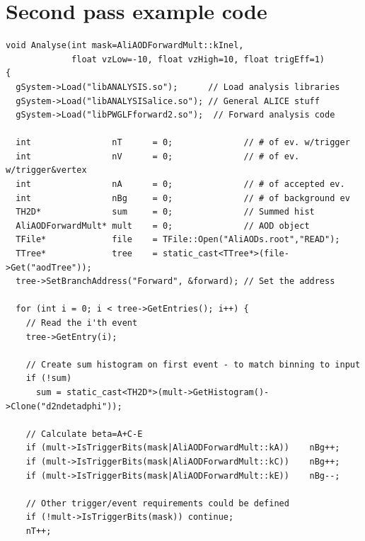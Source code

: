 \documentclass[11pt]{article}
\begin{document}
\section{Second pass example code}
\label{app:exa_pass2}
\begin{lstlisting}[caption={Example 2\textsuperscript{nd} pass code to
    do $\dndeta$},label={lst:example},frame=single,captionpos=b]
void Analyse(int mask=AliAODForwardMult::kInel,
             float vzLow=-10, float vzHigh=10, float trigEff=1)
{ 
  gSystem->Load("libANALYSIS.so");      // Load analysis libraries
  gSystem->Load("libANALYSISalice.so"); // General ALICE stuff
  gSystem->Load("libPWGLFforward2.so");  // Forward analysis code

  int                nT      = 0;              // # of ev. w/trigger
  int                nV      = 0;              // # of ev. w/trigger&vertex
  int                nA      = 0;              // # of accepted ev.
  int                nBg     = 0;              // # of background ev
  TH2D*              sum     = 0;              // Summed hist
  AliAODForwardMult* mult    = 0;              // AOD object
  TFile*             file    = TFile::Open("AliAODs.root","READ");
  TTree*             tree    = static_cast<TTree*>(file->Get("aodTree"));
  tree->SetBranchAddress("Forward", &forward); // Set the address

  for (int i = 0; i < tree->GetEntries(); i++) { 
    // Read the i'th event 
    tree->GetEntry(i);

    // Create sum histogram on first event - to match binning to input
    if (!sum) 
      sum = static_cast<TH2D*>(mult->GetHistogram()->Clone("d2ndetadphi"));
    
    // Calculate beta=A+C-E
    if (mult->IsTriggerBits(mask|AliAODForwardMult::kA))    nBg++;
    if (mult->IsTriggerBits(mask|AliAODForwardMult::kC))    nBg++;
    if (mult->IsTriggerBits(mask|AliAODForwardMult::kE))    nBg--;

    // Other trigger/event requirements could be defined 
    if (!mult->IsTriggerBits(mask)) continue; 
    nT++;


\end{lstlisting}
\end{document}
